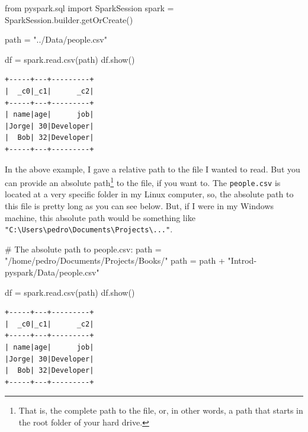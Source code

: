 \documentclass[
  11pt,
  letterpaper,
  DIV=11,
  numbers=noendperiod]{scrreprt}
\newenvironment{Shaded}{\begin{snugshade}}{\end{snugshade}}
\newcommand{\CommentTok}[1]{\textcolor[rgb]{0.37,0.37,0.37}{#1}}
\newcommand{\ImportTok}[1]{\textcolor[rgb]{0.00,0.46,0.62}{#1}}
\newcommand{\NormalTok}[1]{\textcolor[rgb]{0.00,0.23,0.31}{#1}}
\newcommand{\OperatorTok}[1]{\textcolor[rgb]{0.37,0.37,0.37}{#1}}
\newcommand{\StringTok}[1]{\textcolor[rgb]{0.13,0.47,0.30}{#1}}
\begin{document}
\begin{Shaded}
\begin{Highlighting}[]
\ImportTok{from}\NormalTok{ pyspark.sql }\ImportTok{import}\NormalTok{ SparkSession}
\NormalTok{spark }\OperatorTok{=}\NormalTok{ SparkSession.builder.getOrCreate()}

\NormalTok{path }\OperatorTok{=} \StringTok{"../Data/people.csv"}

\NormalTok{df }\OperatorTok{=}\NormalTok{ spark.read.csv(path)}
\NormalTok{df.show()}
\end{Highlighting}
\end{Shaded}

\begin{verbatim}
+-----+---+---------+
|  _c0|_c1|      _c2|
+-----+---+---------+
| name|age|      job|
|Jorge| 30|Developer|
|  Bob| 32|Developer|
+-----+---+---------+
\end{verbatim}

In the above example, I gave a relative path to the file I wanted to
read. But you can provide an absolute path\footnote{That is, the
  complete path to the file, or, in other words, a path that starts in
  the root folder of your hard drive.} to the file, if you want to. The
\texttt{people.csv} is located at a very specific folder in my Linux
computer, so, the absolute path to this file is pretty long as you can
see below. But, if I were in my Windows machine, this absolute path
would be something like
\texttt{"C:\textbackslash{}Users\textbackslash{}pedro\textbackslash{}Documents\textbackslash{}Projects\textbackslash{}..."}.

\begin{Shaded}
\begin{Highlighting}[]
\CommentTok{\# The absolute path to \textasciigrave{}people.csv\textasciigrave{}:}
\NormalTok{path }\OperatorTok{=} \StringTok{"/home/pedro/Documents/Projects/Books/"}
\NormalTok{path }\OperatorTok{=}\NormalTok{ path }\OperatorTok{+} \StringTok{"Introd{-}pyspark/Data/people.csv"}

\NormalTok{df }\OperatorTok{=}\NormalTok{ spark.read.csv(path)}
\NormalTok{df.show()}
\end{Highlighting}
\end{Shaded}

\begin{verbatim}
+-----+---+---------+
|  _c0|_c1|      _c2|
+-----+---+---------+
| name|age|      job|
|Jorge| 30|Developer|
|  Bob| 32|Developer|
+-----+---+---------+
\end{verbatim}
\end{document}
